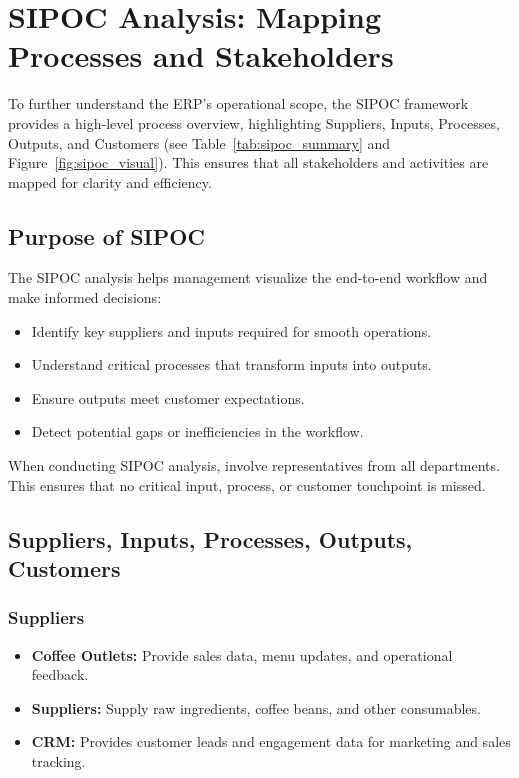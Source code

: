 \section{SIPOC Analysis: Mapping Processes and Stakeholders}

To further understand the ERP’s operational scope, the SIPOC framework provides a high-level process overview, highlighting Suppliers, Inputs, Processes, Outputs, and Customers (see Table~\ref{tab:sipoc_summary} and Figure~\ref{fig:sipoc_visual}). This ensures that all stakeholders and activities are mapped for clarity and efficiency.

\subsection*{Purpose of SIPOC}
The SIPOC analysis helps management visualize the end-to-end workflow and make informed decisions:
\begin{itemize}
    \item Identify key suppliers and inputs required for smooth operations.
    \item Understand critical processes that transform inputs into outputs.
    \item Ensure outputs meet customer expectations.
    \item Detect potential gaps or inefficiencies in the workflow.
\end{itemize}

\begin{tcolorbox}[colback=white,colframe=odooPurple,title=Tip, fonttitle=\bfseries, coltitle=white]
When conducting SIPOC analysis, involve representatives from all departments. 
This ensures that no critical input, process, or customer touchpoint is missed.
\end{tcolorbox}

\subsection*{Suppliers, Inputs, Processes, Outputs, Customers}

\subsubsection*{Suppliers}
\begin{itemize}
    \item \textbf{Coffee Outlets:} Provide sales data, menu updates, and operational feedback.
    \item \textbf{Suppliers:} Supply raw ingredients, coffee beans, and other consumables.
    \item \textbf{CRM:} Provides customer leads and engagement data for marketing and sales tracking.
\end{itemize}

